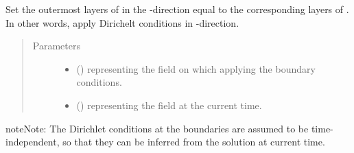 \documentclass[letterpaper,10pt,english]{sphinxmanual}
\begin{document}
\begin{fulllineitems}
\begin{fulllineitems}
\label{\detokenize{api:dycore.horizontal_boundary_relaxed.Relaxed.set_outermost_layers_y}}
Set the outermost layers of  in the -direction equal to the corresponding
layers of . In other words, apply Dirichelt conditions in -direction.
\begin{quote}\begin{description}
\item[{Parameters}] \leavevmode\begin{itemize}
\item {} 
 () \textendash{}  representing the field on which applying the boundary conditions.

\item {} 
 () \textendash{}  representing the field at the current time.

\end{itemize}

\end{description}\end{quote}

\begin{sphinxadmonition}{note}{Note:}
The Dirichlet conditions at the boundaries are assumed to be time-independent, so that they
can be inferred from the solution at current time.
\end{sphinxadmonition}

\end{fulllineitems}


\end{fulllineitems}

\end{document}
